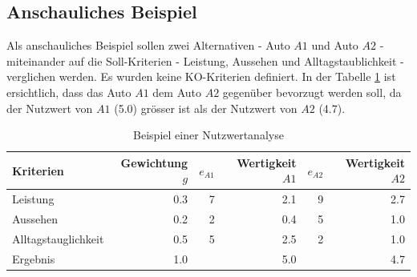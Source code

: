   \subsection{Anschauliches Beispiel}
  
  Als anschauliches Beispiel sollen zwei Alternativen - Auto \(A1\) und Auto
  \(A2\) - miteinander auf die Soll-Kriterien - Leistung, Aussehen und
  Alltagstaublichkeit - verglichen werden. Es wurden keine KO-Kriterien
  definiert. In der Tabelle \ref{tab:beispielNwa} ist ersichtlich, dass das
  Auto \(A1\) dem Auto \(A2\) gegenüber bevorzugt werden soll, da der Nutzwert
  von \(A1\) (5.0) grösser ist als der Nutzwert von \(A2\) (4.7).
  \newline
  
  \begin{table}[h!]
    \sffamily 
    \begin{center}
      \begin{tabular}{lrrrrr}
        \toprule
        \textbf{Kriterien} & \textbf{Gewichtung \(g\)} & \textbf{\(e_{A1}\)} &
        \textbf{Wertigkeit \(A1\)} & \textbf{\(e_{A2}\)} & \textbf{Wertigkeit
        \(A2\)}\\
        \midrule
        Leistung            & 0.3 & 7 & 2.1 & 9 & 2.7 \\
        Aussehen            & 0.2 & 2 & 0.4 & 5 & 1.0 \\
        Alltagstauglichkeit & 0.5 & 5 & 2.5 & 2 & 1.0 \\
        \midrule
        \midrule
        Ergebnis            & 1.0 &   & 5.0 &   & 4.7 \\
        \bottomrule
      \end{tabular}
      \caption{Beispiel einer Nutzwertanalyse}
      \label{tab:beispielNwa}
    \end{center}
  \end{table}
  
